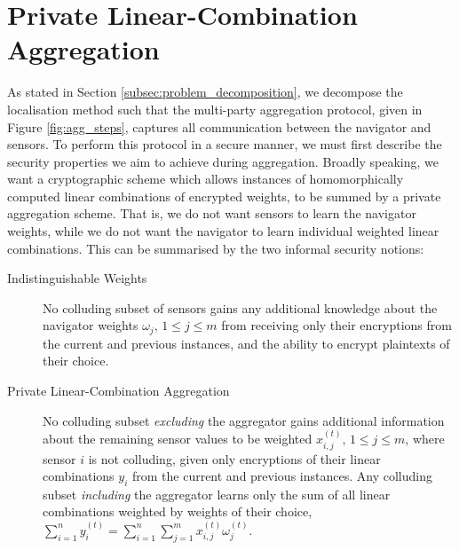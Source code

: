\documentclass[twocolumn]{autart}
\begin{document}
% 
%                                                                                     
%                                                                                     
%                                                                                     
% 

\section{Private Linear-Combination Aggregation} \label{sec:lcao_definition}
As stated in Section \ref{subsec:problem_decomposition}, we decompose the localisation method such that the multi-party aggregation protocol, given in Figure \ref{fig:agg_steps}, captures all communication between the navigator and sensors. To perform this protocol in a secure manner, we must first describe the security properties we aim to achieve during aggregation. Broadly speaking, we want a cryptographic scheme which allows instances of homomorphically computed linear combinations of encrypted weights, to be summed by a private aggregation scheme. That is, we do not want sensors to learn the navigator weights, while we do not want the navigator to learn individual weighted linear combinations. This can be summarised by the two informal security notions:
\begin{description}
    \item[Indistinguishable Weights] No colluding subset of sensors gains any additional knowledge about the navigator weights $\omega_j,\,1\leq j \leq m$ from receiving only their encryptions from the current and previous instances, and the ability to encrypt plaintexts of their choice.
    \item[Private Linear-Combination Aggregation] No colluding subset \textit{excluding} the aggregator gains additional information about the remaining sensor values to be weighted $x^{(t)}_{i,j},\,1\leq j\leq m$, where sensor $i$ is not colluding, given only encryptions of their linear combinations $y_i$ from the current and previous instances. Any colluding subset \textit{including} the aggregator learns only the sum of all linear combinations weighted by weights of their choice, $\sum^{n}_{i=1}y_i^{(t)}=\sum^{n}_{i=1}\sum^{m}_{j=1} x^{(t)}_{i,j}\omega^{(t)}_j$.
\end{description}
\end{document}
